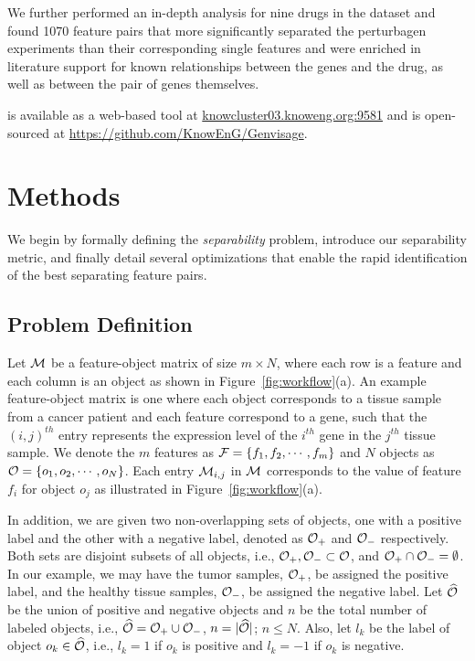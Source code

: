We further performed an in-depth analysis
for nine drugs in the \lincs dataset and
found 1070 feature pairs that more significantly
separated the perturbagen experiments than their
corresponding single features and were enriched
in literature support for known relationships between the genes and the drug,
as well as between the pair of genes themselves.

\genviz is available as a web-based tool at \url{knowcluster03.knoweng.org:9581}
 and is open-sourced at \url{https://github.com/KnowEnG/Genvisage}.


\section{Methods}
\label{sec:method}
We begin by formally defining the {\em separability} problem,
introduce our separability metric,
and finally detail several optimizations that enable
the rapid identification of the best separating feature pairs.

\subsection{Problem Definition}\label{sec:prob}

Let ${\mathcal{M}}$ be a feature-object matrix of size $m\times N$, where each row is a feature and each column is an object as shown in Figure~\ref{fig:workflow}(a). An example feature-object matrix is one where each object corresponds to a tissue sample from a cancer patient and each feature correspond to a gene, such that the $(i,j)^{th}$ entry represents the expression level of the $i^{th}$ gene in the $j^{th}$ tissue sample. We denote the $m$ features as ${\mathcal{F}}=\{f_1,f_2,\cdots,f_m\}$ and $N$ objects as ${\mathcal{O}}=\{o_1,o_2,\cdots,o_N\}$. Each entry ${\mathcal{M}}_{i,j}$ in ${\mathcal{M}}$ corresponds
to the value of feature $f_i$ for object $o_j$ as illustrated in Figure~\ref{fig:workflow}(a).

In addition, we are given two non-overlapping sets of objects, one with a positive label and the other with a negative label, denoted as ${\mathcal{O}}_+$ and ${\mathcal{O}}_-$ respectively. Both sets are disjoint subsets of all objects, i.e., ${\mathcal{O}}_+, {\mathcal{O}}_-\subset {\mathcal{O}}$, and ${\mathcal{O}}_+\cap {\mathcal{O}}_- = \emptyset$. In our example, we may have the tumor samples, ${\mathcal{O}}_+$, be assigned the positive label, and the healthy tissue samples, ${\mathcal{O}}_-$, be assigned the negative label. Let $\widehat{{\mathcal{O}}}$ be the union of positive and negative objects and $n$ be the total number of labeled objects, i.e., $\widehat{{\mathcal{O}}}={\mathcal{O}}_+\cup {\mathcal{O}}_-$, $n=|\widehat{{\mathcal{O}}}|$; $n\leq N$. Also, let $l_k$ be the label of object $o_k\in \widehat{{\mathcal{O}}}$, i.e., $l_k=1$ if $o_k$ is positive and $l_k=-1$ if $o_k$ is negative.

